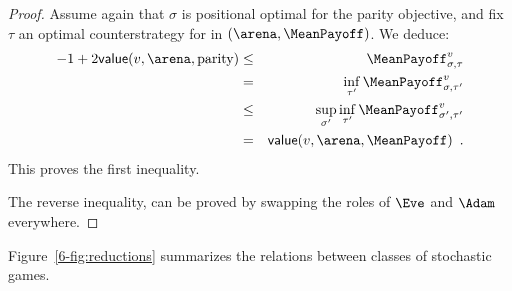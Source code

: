 \begin{proof}
    Assume again that $\sigma$ is positional optimal for the parity
    objective, and fix $\tau$ an optimal counterstrategy for \Adam in
    $(\arena,\MeanPayoff)$. We deduce:
    \begin{eqnarray*}
      -1 + 2 \mathsf{value}(v,\arena,\textrm{parity}) & \leq & 
                                                               \MeanPayoff_{\sigma,\tau}^{v}\\
                                                      & = & \inf_{\tau'}
                                                            \MeanPayoff_{\sigma,\tau'}^{v}\\
                                                      & \leq &
                                                                \sup_{\sigma'}\inf_{\tau'}
                                                               \MeanPayoff_{\sigma',\tau'}^{v}\\
                                                      & = & 
                                                            \mathsf{value}(v,\arena,\MeanPayoff) \enspace.
    \end{eqnarray*} 
    This proves the first inequality.

    The reverse inequality, can be proved by swapping the roles of
    $\Eve$ and $\Adam$ everywhere.
\end{proof}

Figure~\cref{6-fig:reductions} summarizes the relations between classes
of stochastic games.
